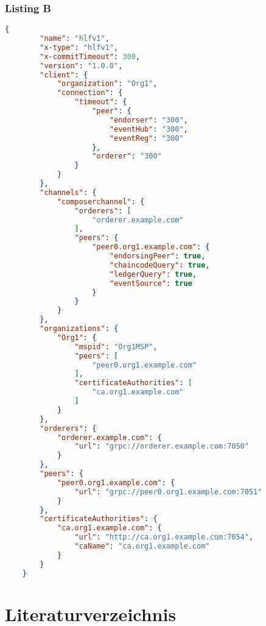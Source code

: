 \subsubsection*{Listing B}
\begin{lstlisting}[caption={Hyperledger Fabric Network \textit{Connection Profile}},captionpos=b,language=json,label=lst:connection-profile]
    {
        "name": "hlfv1",
        "x-type": "hlfv1",
        "x-commitTimeout": 300,
        "version": "1.0.0",
        "client": {
            "organization": "Org1",
            "connection": {
                "timeout": {
                    "peer": {
                        "endorser": "300",
                        "eventHub": "300",
                        "eventReg": "300"
                    },
                    "orderer": "300"
                }
            }
        },
        "channels": {
            "composerchannel": {
                "orderers": [
                    "orderer.example.com"
                ],
                "peers": {
                    "peer0.org1.example.com": {
                        "endorsingPeer": true,
                        "chaincodeQuery": true,
                        "ledgerQuery": true,
                        "eventSource": true
                    }
                }
            }
        },
        "organizations": {
            "Org1": {
                "mspid": "Org1MSP",
                "peers": [
                    "peer0.org1.example.com"
                ],
                "certificateAuthorities": [
                    "ca.org1.example.com"
                ]
            }
        },
        "orderers": {
            "orderer.example.com": {
                "url": "grpc://orderer.example.com:7050"
            }
        },
        "peers": {
            "peer0.org1.example.com": {
                "url": "grpc://peer0.org1.example.com:7051"
            }
        },
        "certificateAuthorities": {
            "ca.org1.example.com": {
                "url": "http://ca.org1.example.com:7054",
                "caName": "ca.org1.example.com"
            }
        }
    }
\end{lstlisting}

\newpage
\section{Literaturverzeichnis}
\renewcommand{\refname}{B LITERATURVERZEICHNIS}

{\def\section*#1{}}

\newpage
